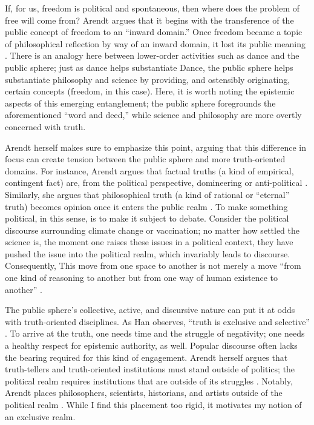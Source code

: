 \documentclass[12pt,letterpaper]{article}
\begin{document}
If, for us, freedom is political and spontaneous, then where does the problem of
free will come from? Arendt argues that it begins with the transference of the
public concept of freedom to an ``inward domain.'' Once freedom became a topic
of philosophical reflection by way of an inward domain, it lost its public
meaning \autocite[146]{arendtFuture1968}. There is an analogy here between
lower-order activities such as dance and the public sphere; just as dance helps
substantiate Dance, the public sphere helps substantiate philosophy and science
by providing, and ostensibly originating, certain concepts (freedom, in this
case). Here, it is worth noting the epistemic aspects of this emerging
entanglement; the public sphere foregrounds the aforementioned ``word and
deed,'' while science and philosophy are more overtly concerned with truth.

Arendt herself makes sure to emphasize this point, arguing that this difference
in focus can create tension between the public sphere and more truth-oriented
domains. For instance, Arendt argues that factual truths (a kind of empirical,
contingent fact) are, from the political perspective, domineering or
anti-political \autocite[241]{arendtFuture1968}. Similarly, she argues that
philosophical truth (a kind of rational or ``eternal'' truth) becomes opinion
once it enters the public realm \autocite[238]{arendtFuture1968}. To make
something political, in this sense, is to make it subject to debate. Consider
the political discourse surrounding climate change or vaccination; no matter how
settled the science is, the moment one raises these issues in a political
context, they have pushed the issue into the political realm, which invariably
leads to discourse. Consequently, This move from one space to another is not
merely a move ``from one kind of reasoning to another but from one way of human
existence to another'' \autocite[238]{arendtFuture1968}.

The public sphere's collective, active, and discursive nature can put it at odds
with truth-oriented disciplines. As Han observes, ``truth is exclusive and
selective'' \autocite[40]{hanSwarm2017}. To arrive at the truth, one needs time
and the struggle of negativity; one needs a healthy respect for epistemic
authority, as well. Popular discourse often lacks the bearing required for this
kind of engagement. Arendt herself argues that truth-tellers and truth-oriented
institutions must stand outside of politics; the political realm requires
institutions that are outside of its struggles
\autocite[260--261]{arendtFuture1968}. Notably, Arendt places philosophers,
scientists, historians, and artists outside of the political realm
\autocite[259-260]{arendtFuture1968}. While I find this placement too rigid, it
motivates my notion of an exclusive realm.
\end{document}
